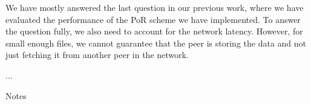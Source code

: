 We have mostly answered the last question in our previous work, where we have evaluated the performance of
the PoR scheme we have implemented.
To answer the question fully, we also need to account for the network latency.
However, for small enough files, we cannot guarantee that the peer is storing the data
and not just fetching it from another peer in the network.

...







Notes 

